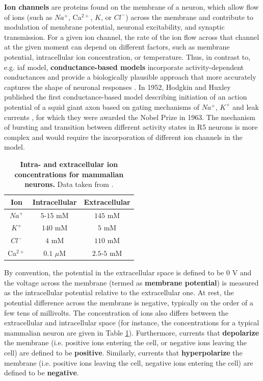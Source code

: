 \documentclass[../main.tex]{subfiles}
\begin{document}
\textbf{Ion channels} are proteins found on the membrane of a neuron, which allow flow of ions (such as $Na^+$, Ca$^{2+}$, $K$, or $Cl^-$) across the membrane and contribute to modulation of membrane potential, neuronal excitability, and synaptic transmission. For a given ion channel, the rate of the ion flow across that channel at the given moment can depend on different factors, such as membrane potential, intracellular ion concentration, or temperature. Thus, in contrast to, e.g. \gls{iaf} model, \textbf{conductance-based models} incorporate activity-dependent conductances and provide a biologically plausible approach that more accurately captures the shape of neuronal responses \parencite{destexheConductanceBasedIntegrateandFireModels1997}. In 1952, Hodgkin and Huxley published the first conductance-based model describing initiation of an action potential of a squid giant axon based on gating mechanisms of $Na^{+}$, $K^+$ and leak currents \parencite{hodgkinQuantitativeDescriptionMembrane1952}, for which they were awarded the Nobel Prize in 1963. The mechanism of bursting and transition between different activity states in R5 neurons is more complex and would require the incorporation of different ion channels in the model.

\begin{table}[!b]
    \centering
    \begin{tabular}{|c|c|c|}
        \hline
        Ion & Intracellular & Extracellular \\
        \hline
        \hline
        $Na^+$     & $5$-$15$ mM    & $145$ mM    \\
        $K^+$      & $140$ mM       & $5$ mM      \\
        $Cl^-$     & $4$ mM         & $110$ mM    \\
        Ca$^{2+}$  & $0.1$ $\mu$M   & $2.5$-$5$ mM \\
        \hline
    \end{tabular}
    \caption[Intra- and extracellular ion concentrations for mammalian neurons]{
        \textbf{Intra- and extracellular ion concentrations for mammalian neurons.}
        Data taken from \parencite{izhikevichDynamicalSystemsNeuroscience2006}.
    }
    \label{tab:typical_ion_concentrations_in_mammaly}
\end{table}

By convention, the potential in the extracellular space is defined to be $0$ V and the voltage across the membrane (termed as \textbf{membrane potential}) is measured as the intracellular potential relative to the extracellular one. At rest, the potential difference across the membrane is negative, typically on the order of a few tens of millivolts. The concentration of ions also differs between the extracellular and intracellular space (for instance, the concentrations for a typical mammalian neuron are given in Table \ref{tab:typical_ion_concentrations_in_mammaly}). Furthermore, currents that \textbf{depolarize} the membrane (i.e. positive ions entering the cell, or negative ions leaving the cell) are defined to be \textbf{positive}. Similarly, currents that \textbf{hyperpolarize} the membrane (i.e. positive ions leaving the cell, negative ions entering the cell) are defined to be \textbf{negative}.
\end{document}
